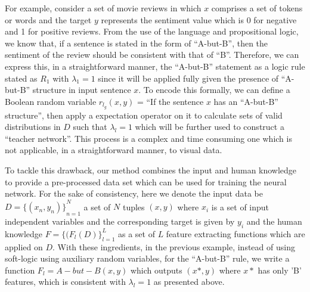 \documentclass[12pt,a4paper]{article}
\begin{document}
For example, consider a set of movie reviews in which $x$ comprises a set of tokens or words and the target $y$ represents the sentiment value which is 0 for negative and 1 for positive reviews. From the use of the language and propositional logic, we know that, if a sentence is stated in the form of ``A-but-B'', then the sentiment of the review should be consistent with that of ``B''. Therefore, we can express this, in a straightforward manner, the ``A-but-B'' statement as a logic rule stated as $R_1$ with \begin{math}\lambda_1 = 1\end{math} since it will be applied fully given the presence of ``A-but-B'' structure in input sentence $x$. To encode this formally, we can define a Boolean random variable \begin{math}r_{l_g}(x,y)\end{math} = ``If the sentence $x$ has an ``A-but-B'' structure'', then apply a expectation operator on it to calculate sets of valid distributions in \begin{math}D\end{math} such that $\lambda_l = 1$ which will be further used to construct a ``teacher network''. This process is a complex and time consuming one which is not applicable, in a straightforward manner, to visual data.
\vspace{2mm}

To tackle this drawback, our method combines the input and human knowledge to provide a pre-processed data set which can be used for training the neural network. For the sake of consistency, here we denote the input data be \begin{math} D = {\{ (x_n,y_n) \}}_{n=1}^N\end{math} a set of $N$ tuples $(x,y)$ where $x_i$ is a set of input independent variables and the corresponding target is given by $y_i$ and the human knowledge \begin{math}F = {\{ (F_l(D) \}}_{l=1}^L\end{math} as a set of \begin{math}L\end{math} feature extracting functions which are applied on \begin{math}D\end{math}. With these ingredients, in the previous example, instead of using soft-logic using auxiliary random variables, for the ``A-but-B'' rule, we write a function \begin{math}F_l = A-but-B(x,y)\end{math} which outputs $(x*,y)$ where $x*$ has only 'B' features, which is consistent with \begin{math}\lambda_l = 1\end{math} as presented above.
\vspace{2mm}
\end{document}
